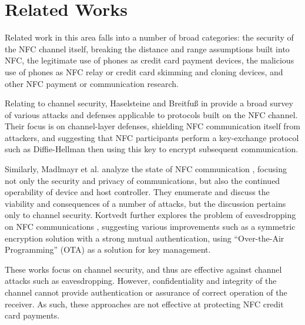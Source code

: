 \section{Related Works}
\label{sec:related}


Related work in this area falls into a number of broad categories:
     the security of the NFC channel itself,
     breaking the distance and range assumptions built into NFC,
     the legitimate use of phones as credit card payment devices,
     the malicious use of phones as NFC relay or credit card skimming and cloning devices,
     and other NFC payment or communication research.



Relating to channel security, Haselsteine and Breitfu{\ss} in \cite{haselsteiner2006security} provide a broad survey
    of various attacks and defenses applicable to protocols built on the NFC channel.
Their focus is on channel-layer defenses, shielding NFC communication itself from attackers,
    and suggesting that NFC participants perform a key-exchange protocol such as Diffie-Hellman \cite{diffiehellman}
    then using this key to encrypt subsequent communication.

Similarly, Madlmayr et al. analyze the state of NFC communication \cite{madlmayr2008nfc},
    focusing not only the security and privacy of communications, but also the continued operability of device and host controller.
They enumerate and discuss the viability and consequences of a number of attacks, but the discussion pertains only to channel security.
Kortvedt further explores the problem of eavesdropping on NFC communications \cite{kortvedt2009securing},
    suggesting various improvements such as a symmetric encryption solution with a strong mutual authentication,
    using ``Over-the-Air Programming'' (OTA) as a solution for key management.

These works \cite{haselsteiner2006security, kortvedt2009securing, madlmayr2008nfc} focus on channel security,
    and thus are effective against channel attacks such as eavesdropping.
However, confidentiality and integrity of the channel cannot provide authentication or assurance of correct operation of the receiver.
As such, these approaches are not effective at protecting NFC credit card payments.

